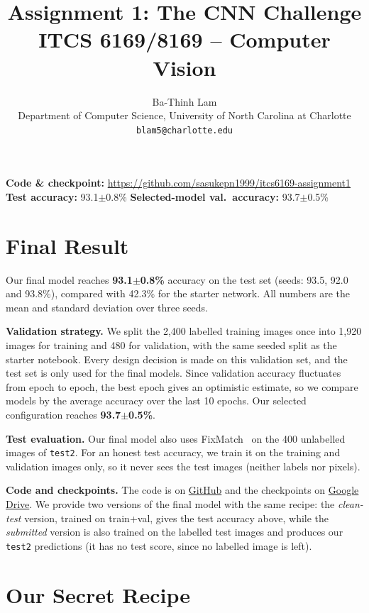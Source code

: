 \documentclass{article}
\title{Assignment 1: The CNN Challenge\\[2pt] \large ITCS 6169/8169 -- Computer Vision}
\author{%
  Ba-Thinh Lam \\ Department of Computer Science, University of North Carolina at Charlotte \\ \texttt{blam5@charlotte.edu}
}
\begin{document}
\maketitle
\vspace{-0.9cm}
\begin{center}
\textbf{Code \& checkpoint:} \url{https://github.com/sasukepn1999/itcs6169-assignment1} \quad
\textbf{Test accuracy:} 93.1$\pm$0.8\% \quad
\textbf{Selected-model val.\ accuracy:} 93.7$\pm$0.5\%
\end{center}

\section{Final Result}
\label{sec:result}

Our final model reaches \textbf{93.1$\pm$0.8\%} accuracy on the test set (seeds: 93.5, 92.0 and 93.8\%), compared with 42.3\% for the starter network. All numbers are the mean and standard deviation over three seeds.

\textbf{Validation strategy.} We split the 2,400 labelled training images once into 1,920 images for training and 480 for validation, with the same seeded split as the starter notebook. Every design decision is made on this validation set, and the test set is only used for the final models. Since validation accuracy fluctuates from epoch to epoch, the best epoch gives an optimistic estimate, so we compare models by the average accuracy over the last 10 epochs. Our selected configuration reaches \textbf{93.7$\pm$0.5\%}.

\textbf{Test evaluation.} Our final model also uses FixMatch~\cite{fixmatch} on the 400 unlabelled images of \texttt{test2}. For an honest test accuracy, we train it on the training and validation images only, so it never sees the test images (neither labels nor pixels).

\textbf{Code and checkpoints.} The code is on \href{https://github.com/sasukepn1999/itcs6169-assignment1}{GitHub} and the checkpoints on \href{https://drive.google.com/drive/folders/1q_nvnQqREGNsdmdg47nAFXf_cUVyYREe?usp=sharing}{Google Drive}. We provide two versions of the final model with the same recipe: the \emph{clean-test} version, trained on train+val, gives the test accuracy above, while the \emph{submitted} version is also trained on the labelled test images and produces our \texttt{test2} predictions (it has no test score, since no labelled image is left).

\section{Our Secret Recipe}
\label{sec:recipe}
\end{document}
